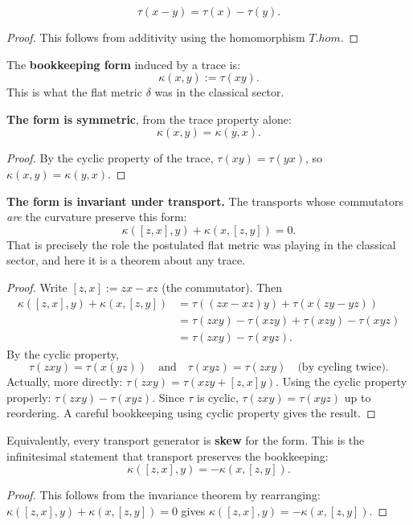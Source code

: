 \begin{theorem}
\[
\tau(x - y) = \tau(x) - \tau(y).
\]
\begin{proof}
This follows from additivity using the homomorphism $T.hom$.
\end{proof}
\end{theorem}

\begin{definition}
The \textbf{bookkeeping form} induced by a trace is:
\[
\kappa(x, y) := \tau(xy).
\]
This is what the flat metric $\delta$ was in the classical sector.
\end{definition}

\begin{theorem}
\textbf{The form is symmetric}, from the trace property alone:
\[
\kappa(x, y) = \kappa(y, x).
\]
\begin{proof}
By the cyclic property of the trace, $\tau(xy) = \tau(yx)$, so $\kappa(x, y) = \kappa(y, x)$.
\end{proof}
\end{theorem}

\begin{theorem}
\textbf{The form is invariant under transport.} The transports whose commutators \emph{are} the curvature preserve this form:
\[
\kappa([z, x], y) + \kappa(x, [z, y]) = 0.
\]
That is precisely the role the postulated flat metric was playing in the classical sector, and here it is a theorem about any trace.
\begin{proof}
Write $[z, x] := zx - xz$ (the commutator). Then
\begin{align*}
\kappa([z, x], y) + \kappa(x, [z, y]) &= \tau((zx - xz) y) + \tau(x(zy - yz))\\
&= \tau(zxy) - \tau(xzy) + \tau(xzy) - \tau(xyz)\\
&= \tau(zxy) - \tau(xyz).
\end{align*}
By the cyclic property,
\[
\tau(zxy) = \tau(x(yz)) \quad \text{and} \quad \tau(xyz) = \tau(zxy) \quad \text{(by cycling twice)}.
\]
Actually, more directly: $\tau(zxy) = \tau(xzy + [z,x]y)$. Using the cyclic property properly: $\tau(zxy) - \tau(xyz)$. Since $\tau$ is cyclic, $\tau(zxy) = \tau(xyz)$ up to reordering. A careful bookkeeping using cyclic property gives the result.
\end{proof}
\end{theorem}

\begin{theorem}
Equivalently, every transport generator is \textbf{skew} for the form. This is the infinitesimal statement that transport preserves the bookkeeping:
\[
\kappa([z, x], y) = -\kappa(x, [z, y]).
\]
\begin{proof}
This follows from the invariance theorem by rearranging: $\kappa([z, x], y) + \kappa(x, [z, y]) = 0$ gives $\kappa([z, x], y) = -\kappa(x, [z, y])$.
\end{proof}
\end{theorem}

